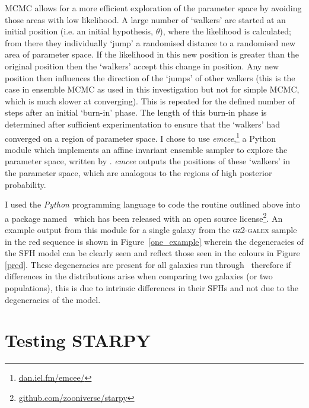 MCMC allows for a more efficient exploration of the parameter space by avoiding those areas with low likelihood. A large number of `walkers' are started at an initial position (i.e. an initial hypothesis, $\theta$), where the likelihood is calculated; from there they individually `jump' a randomised distance to a randomised new area of parameter space. If the likelihood in this new position is greater than the original position then the `walkers' accept this change in position. Any new position then influences the direction of the  `jumps' of other walkers (this is the case in ensemble MCMC as used in this investigation but not for simple MCMC, which is much slower at converging). This is repeated for the defined number of steps after an initial `burn-in' phase. The length of this burn-in phase is determined after sufficient experimentation to ensure that the `walkers' had converged on a region of parameter space. I chose to use \emph{emcee},\footnote{\url{dan.iel.fm/emcee/}} a Python module which implements an affine invariant ensemble sampler to explore the parameter space, written by \cite{emcee13}. \emph{emcee} outputs the positions of these `walkers' in the parameter space, which are analogous to the regions of high posterior probability. 

I used the \emph{Python} programming language to code the routine outlined above into a package named \starpy ~which has been released with an open source license\footnote{\url{github.com/zooniverse/starpy}}. An example output from this module for a single galaxy from the \textsc{gz2-galex} sample in the red sequence is shown in Figure~\ref{one_example} wherein the degeneracies of the SFH model can be clearly seen and reflect those seen in the colours in Figure \ref{pred}. These degeneracies are present for all galaxies run through \starpy\ therefore if differences in the distributions arise when comparing two galaxies (or two populations), this is due to intrinsic differences in their SFHs and not due to the degeneracies of the model. 

\section{Testing STARPY}


